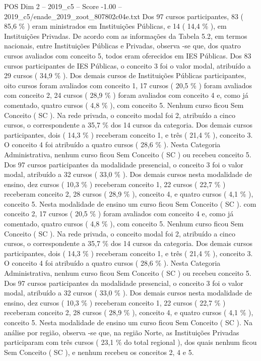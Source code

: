\begin{textsample}{POS Dim 2 – 2019\_c5 – Score -1.00 – 2019\_c5/enade\_2019\_zoot\_807802c04e.txt}
Dos 97 cursos participantes, 83 ( 85,6 \% ) eram ministrados em Instituições Públicas, e 14 ( 14,4 \% ), em Instituições Privadas.
De acordo com as informações da Tabela 5.2, em termos nacionais, entre Instituições Públicas e Privadas, observa -se que, dos quatro cursos avaliados com conceito 5, todos eram oferecidos em IES Públicas.
Dos 83 cursos participantes de IES Públicas, o conceito 3 foi o valor modal, atribuído a 29 cursos ( 34,9 \% ).
Dos demais cursos de Instituições Públicas participantes, oito cursos foram avaliados com conceito 1, 17 cursos ( 20,5 \% ) foram avaliados com conceito 2, 24 cursos ( 28,9 \% ) foram avaliados com conceito 4 e, como já comentado, quatro cursos ( 4,8 \% ), com conceito 5.
Nenhum curso ficou Sem Conceito ( SC ).
Na rede privada, o conceito modal foi 2, atribuído a cinco cursos, o correspondente a 35,7 \% dos 14 cursos da categoria.
Dos demais cursos participantes, dois ( 14,3 \% ) receberam conceito 1, e três ( 21,4 \% ), conceito 3.
O conceito 4 foi atribuído a quatro cursos ( 28,6 \% ).
Nesta Categoria Administrativa, nenhum curso ficou Sem Conceito ( SC ) ou recebeu conceito 5.
Dos 97 cursos participantes da modalidade presencial, o conceito 3 foi o valor modal, atribuído a 32 cursos ( 33,0 \% ).
Dos demais cursos nesta modalidade de ensino, dez cursos ( 10,3 \% ) receberam conceito 1, 22 cursos ( 22,7 \% ) receberam conceito 2, 28 cursos ( 28,9 \% ), conceito 4, e quatro cursos ( 4,1 \% ), conceito 5.
Nesta modalidade de ensino um curso ficou Sem Conceito ( SC ). com conceito 2, 17 cursos ( 20,5 \% ) foram avaliados com conceito 4 e, como já comentado, quatro cursos ( 4,8 \% ), com conceito 5.
Nenhum curso ficou Sem Conceito ( SC ).
Na rede privada, o conceito modal foi 2, atribuído a cinco cursos, o correspondente a 35,7 \% dos 14 cursos da categoria.
Dos demais cursos participantes, dois ( 14,3 \% ) receberam conceito 1, e três ( 21,4 \% ), conceito 3.
O conceito 4 foi atribuído a quatro cursos ( 28,6 \% ).
Nesta Categoria Administrativa, nenhum curso ficou Sem Conceito ( SC ) ou recebeu conceito 5.
Dos 97 cursos participantes da modalidade presencial, o conceito 3 foi o valor modal, atribuído a 32 cursos ( 33,0 \% ).
Dos demais cursos nesta modalidade de ensino, dez cursos ( 10,3 \% ) receberam conceito 1, 22 cursos ( 22,7 \% ) receberam conceito 2, 28 cursos ( 28,9 \% ), conceito 4, e quatro cursos ( 4,1 \% ), conceito 5.
Nesta modalidade de ensino um curso ficou Sem Conceito ( SC ).
Na análise por região, observa -se que, na região Norte, as Instituições Privadas participaram com três cursos ( 23,1 \% do total regional ), dos quais nenhum ficou Sem Conceito ( SC ), e nenhum recebeu os conceitos 2, 4 e 5.

\end{textsample}
